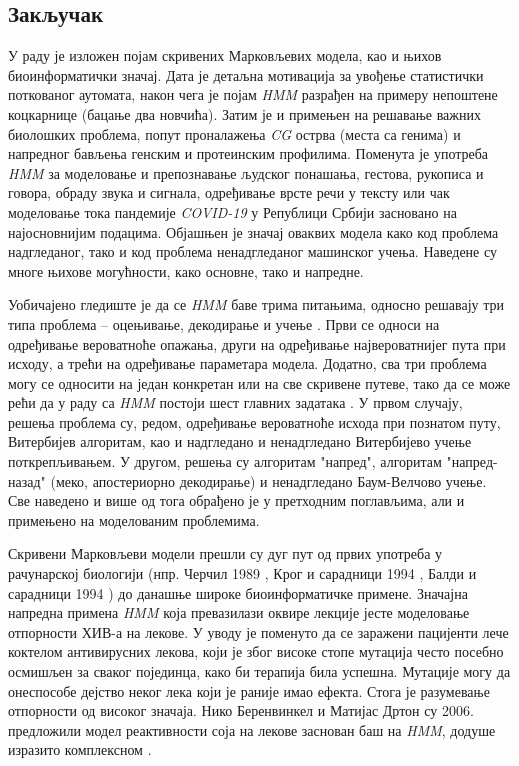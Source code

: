 \documentclass[12pt,oneside]{memoir}
\begin{document}
\begin{CJK}{UTF8}{ipxm}
\chapter{Закључак}
У раду је изложен појам скривених Марковљевих модела, као и њихов биоинформатички значај. Дата је детаљна мотивација за увођење статистички поткованог аутомата, након чега је појам \textit{HMM} разрађен на примеру непоштене коцкарнице (бацање два новчића). Затим је и примењен на решавање важних биолошких проблема, попут проналажења \textit{CG} острва (места са генима) и напредног бављења генским и протеинским профилима. Поменута је употреба \textit{HMM} за моделовање и препознавање људског понашања, гестова, рукописа и говора, обраду звука и сигнала, одређивање врсте речи у тексту или чак моделовање тока пандемије \textit{COVID-19} у Републици Србији засновано на најосновнијим подацима. Објашњен је значај оваквих модела како код проблема надгледаног, тако и код проблема ненадгледаног машинског учења. Наведене су многе њихове могућности, како основне, тако и напредне.

Уобичајено гледиште је да се \textit{HMM} баве трима питањима, односно решавају три типа проблема -- оцењивање, декодирање и учење \cite{rabiner1989}. Први се односи на одређивање вероватноће опажања, други на одређивање највероватнијег пута при исходу, а трећи на одређивање параметара модела. Додатно, сва три проблема могу се односити на један конкретан или на све скривене путеве, тако да се може рећи да у раду са \textit{HMM} постоји шест главних задатака \cite{kelliss2021}. У првом случају, решења проблема су, редом, одређивање вероватноће исхода при познатом путу, Витербијев алгоритам, као и надгледано и ненадгледано Витербијево учење поткрепљивањем. У другом, решења су алгоритам "напред", алгоритам "напред-назад" (меко, апостериорно декодирање) и ненадгледано Баум-Велчово учење. Све наведено и више од тога обрађено је у претходним поглављима, али и примењено на моделованим проблемима.

Скривени Марковљеви модели прешли су дуг пут од првих употреба у рачунарској биологији (нпр. Черчил 1989 \cite{churchill1989}, Крог и сарадници 1994 \cite{krogh1994}, Балди и сарадници 1994 \cite{baldi1994}) до данашње широке биоинформатичке примене. Значајна напредна примена \textit{HMM} која превазилази оквире лекције јесте моделовање отпорности ХИВ-а на лекове. У уводу је поменуто да се заражени пацијенти лече коктелом антивирусних лекова, који је због високе стопе мутација често посебно осмишљен за сваког појединца, како би терапија била успешна. Мутације могу да онеспособе дејство неког лека који је раније имао ефекта. Стога је разумевање отпорности од високог значаја. Нико Беренвинкел и Матијас Дртон су 2006. предложили модел реактивности соја на лекове заснован баш на \textit{HMM}, додуше изразито комплексном \cite{beerenwinkel2007}.


\end{CJK}
\end{document}
